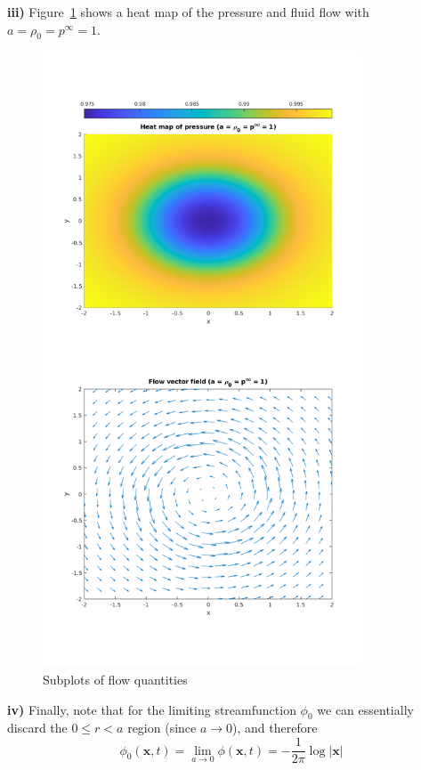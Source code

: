 \documentclass{article}
\def\*#1{\mathbf{#1}}
\begin{document}
\textbf{iii)} Figure~\ref{fig:aiii} shows a heat map of the pressure and
fluid flow with $a = \rho_0 = p^\infty = 1$.
%
\begin{figure}
    \includegraphics[width=95mm]{as05fig2}
    \centering
    \caption{Subplots of flow quantities}
    \label{fig:aiii}
\end{figure}

\textbf{iv)} Finally, note that for the limiting streamfunction $\phi_0$
we can essentially discard the $0 \leq r < a$ region (since $a \to 0$),
and therefore
%
\begin{equation*}
    \phi_0(\*x, t) = \lim_{a \to 0} \phi(\*x, t) = - \frac{1}{2 \pi} \log |\*x|
\end{equation*}

\newpage
\end{document}
